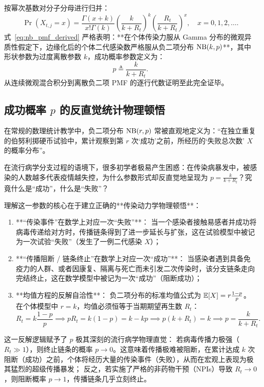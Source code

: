 按幂次基数对分子分母进行归并：
\begin{equation}
\Pr(X_{t,j} = x) = \frac{\Gamma(x+k)}{x! \Gamma(k)} \left( \frac{k}{k + R_t} \right)^k \left( \frac{R_t}{k + R_t} \right)^x, \quad x = 0, 1, 2, \dots. \label{eq:nb_pmf_derived}
\end{equation}
式~\eqref{eq:nb_pmf_derived} 严格表明：**在个体传染力服从 Gamma 分布的微观异质性假定下，边缘化后的个体二代感染数严格服从负二项分布 $\operatorname{NB}(k, p)$**，其中形状参数为过度离散参数 $k$，成功概率参数定义为：
\begin{equation}
p \triangleq \frac{k}{k + R_t}. \label{eq:prob_p_def}
\end{equation}
从连续微观混合积分到离散负二项 PMF 的逐行代数证明至此完全证毕。

\subsection{成功概率 $p$ 的反直觉统计物理顿悟}
在常规的数理统计教学中，负二项分布 $\operatorname{NB}(r, p)$ 常被直观地定义为：“在独立重复的伯努利掷硬币试验中，累计观察到第 $r$ 次‘成功’之前，所经历的‘失败总次数’ $X$ 的概率分布”。

在流行病学分支过程的语境下，很多初学者极易产生困惑：在传染病暴发中，被感染的人数越多代表疫情越失控，为什么参数形式却反直觉地呈现为 $p = \frac{k}{k + R_t}$？究竟什么是“成功”，什么是“失败”？

理解这一参数的核心在于建立正确的**传染动力学物理顿悟**：
\begin{enumerate}[label=(\arabic*)]
    \item **“传染事件”在数学上对应一次“失败”**：
    当一个感染者接触易感者并成功将病毒传递给对方时，传播链条得到了进一步延长与扩张，这在试验模型中被记为一次试验“失败”（发生了一例二代感染 $X$）；
    \item **“传播阻断 / 链条终止”在数学上对应一次“成功”**：
    当感染者遇到具备免疫力的人群、或者因康复、隔离与死亡而未引发二次传染时，该分支链条走向完结终止，这在数学模型中被记为一次“成功”（阻断成功）；
    \item **均值方程的反解自洽性**：
    负二项分布的标准均值公式为 $\operatorname{\mathbb{E}}[X] = r \frac{1-p}{p}$。在个体模型中 $r = k$，均值必须恒等于当期期望再生数 $R_t$：
    \begin{equation}
    R_t = k \frac{1-p}{p} \implies p R_t = k(1-p) = k - kp \implies p(k + R_t) = k \implies p = \frac{k}{k + R_t}.
    \end{equation}
\end{enumerate}
这一反解逻辑赋予了 $p$ 极其深刻的流行病学物理直觉：
若病毒传播力极强（$R_t \gg 1$），则终止链条的概率 $p \to 0$。这意味着传播极难被阻断，在累计达成 $k$ 次阻断（成功）之前，个体将经历大量的传染事件（失败），从而在宏观上表现为极其猛烈的超级传播暴发；
反之，若实施了严格的非药物干预（NPIs）导致 $R_t \to 0$，则阻断概率 $p \to 1$，传播链条几乎立刻终止。

